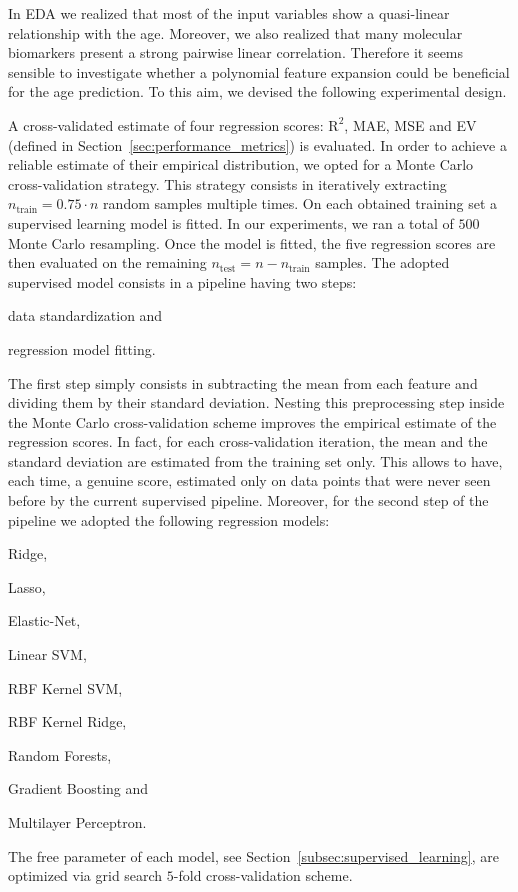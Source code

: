 In EDA we realized that most of the input variables show a quasi-linear relationship with the age. Moreover, we also realized that many molecular biomarkers present a strong pairwise linear correlation. Therefore it seems sensible to investigate whether a polynomial feature expansion could be beneficial for the age prediction.
To this aim, we devised the following experimental design.


A cross-validated estimate of four regression scores: $\text{R}^2$, MAE, MSE and EV (defined in Section~\ref{sec:performance_metrics}) is evaluated.
In order to achieve a reliable estimate of their empirical distribution, we opted for a Monte Carlo cross-validation strategy.
This strategy consists in iteratively extracting $n_{\text{train}} = 0.75 \cdot n$ random samples multiple times. On each obtained training set a supervised learning model is fitted. In our experiments, we ran a total of $500$ Monte Carlo resampling.
Once the model is fitted, the five regression scores are then evaluated on the remaining $n_{\text{test}} = n - n_{\text{train}}$ samples.
The adopted supervised model consists in a pipeline having two steps:
\begin{enumerate*}[label=(\roman*)]
	\item data standardization and
	\item regression model fitting.
\end{enumerate*}
The first step simply consists in subtracting the mean from each feature and dividing them by their standard deviation. Nesting this preprocessing step inside the Monte Carlo cross-validation scheme improves the empirical estimate of the regression scores. In fact, for each cross-validation iteration, the mean and the standard deviation are estimated from the training set only. This allows to have, each time, a genuine score, estimated only on data points that were never seen before by the current supervised pipeline.
Moreover, for the second step of the pipeline we adopted the following regression models:
\begin{enumerate*}[label=(\alph*)]
	\item Ridge,
	\item Lasso,
	\item Elastic-Net,
	\item Linear SVM,
	\item RBF Kernel SVM,
	\item RBF Kernel Ridge,
	\item Random Forests,
	\item Gradient Boosting and
	\item Multilayer Perceptron.
\end{enumerate*}
The free parameter of each model, see Section~\ref{subsec:supervised_learning}, are optimized via grid search $5$-fold cross-validation scheme.

